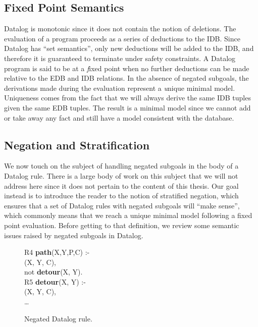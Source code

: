 \subsection{Fixed Point Semantics}

Datalog is monotonic since it does not contain the notion of deletions.  The
evaluation of a program proceeds as a series of deductions to the IDB.  Since
Datalog has ``set semantics'', only new deductions will be added to the IDB,
and therefore it is guaranteed to terminate under safety constraints.  A
Datalog program is said to be at a {\emph fixed point} when no further
deductions can be made relative to the EDB and IDB relations.  In the absence
of negated subgoals, the derivations made during the evaluation represent a
{\emph unique minimal model}.  Uniqueness comes from the fact that we will
always derive the same IDB tuples given the same EDB tuples.  The result is a
minimal model since we cannot add or take away any fact and still have a model
consistent with the database.

\subsection{Negation and Stratification}

We now touch on the subject of handling negated subgoals in the body of a
Datalog rule.  There is a large body of work on this subject that we will not
address here since it does not pertain to the content of this thesis.  Our goal
instead is to introduce the reader to the notion of stratified negation, which
ensures that a set of Datalog rules with negated subgoals will ``make sense'',
which commonly means that we reach a unique minimal model following a fixed
point evaluation.  Before getting to that definition, we review some semantic
issues raised by negated subgoals in Datalog.

\begin{figure}
\centering
\ssp
\begin{boxedminipage}{\linewidth}
R4 {\bf path}(X,Y,P,C) :- \\
(X, Y, C), \\
\datalogspace not {\bf detour}(X, Y). \\

R5 {\bf detour}(X, Y) :- \\
(X, Y, C), \\
\datalogspace \ldots 
\end{boxedminipage}
\caption{\label{ch:p2:fig:negation}Negated Datalog rule.}
\end{figure}

